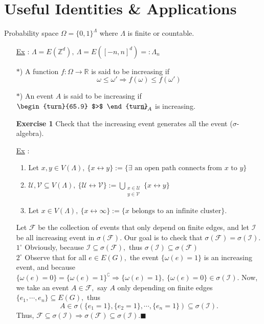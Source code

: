 \documentclass[12pt,a4paper]{report}
\theoremstyle{definition}
\newcommand{\SOL}{\fbox{ \tt s\parbox[b][2pt][c]{6pt}{o}\hspace*{-7pt} L:}}
\newcommand{\indecate}{\mbox{\begin{turn}{65.9}
$>$
\end{turn}\hspace{-10.5pt}\parbox[t][-5pt][c]{10pt}{$\bot$}\hspace{-4.35pt}\parbox[t][-3.4pt][c]{4pt}{$\shortmid$}}}
\begin{document}
\chapter{Useful Identities \& Applications}
\begin{flushleft}
Probability space $\Omega=\{0,1\}^{\Lambda}$ where $\Lambda$ is finite or countable.
\end{flushleft}
\begin{enumerate}
    \item[\underline{Ex} :] $\Lambda=E(\mathbb{Z}^d),\ \Lambda=E([-n,n]^d)=:\Lambda_n$ 
    \begin{center}
    \end{center}
    \item[$*$)] A function $f:\Omega\to\mathbb{R}$ is said to be increasing if 
    \[
    \omega\leq \omega'\Rightarrow f(\omega)\leq f(\omega')
    \]
    \item[$*$)] An event $A$ is said to be increasing if $\indecate_A$ is increasing.
    \item[\textbf{Exercise 1}] Check that the increasing event generates all the event ($\sigma$-algebra).
    \item[\underline{Ex} :] \begin{enumerate}
        \item Let $x,y\in V(\Lambda),\ \{x\leftrightarrow y\}:=\{\exists\mbox{ an open path connects from } x \mbox{ to }y\}$
        \item $\mathcal{U},\mathcal{V}\subseteq V(\Lambda),\ \{\mathcal{U}\leftrightarrow\mathcal{V}\}:=\bigcup\limits_{\substack{x\in \mathcal{U}\\ y\in \mathcal{V}}}\{x\leftrightarrow y\}$
        \item Let $x\in V(\Lambda),\ \{x\leftrightarrow\infty\}:=\{x\mbox{ belongs to an infinite cluster}\}.$
    \end{enumerate}
    \item[\SOL] Let $\mathcal{F}$ be the collection of events that only depend on finite edges, and let $\mathcal{I}$ be all increasing event in $\sigma(\mathcal{F}).$ Our goal is to check that $\sigma(\mathcal{F})=\sigma(\mathcal{I}).$\\[5pt]
    $1^\circ$ Obviously, because $\mathcal{I}\subseteq \sigma(\mathcal{F}),$ thus $\sigma(\mathcal{I})\subseteq \sigma(\mathcal{F})$\\[5pt]
    $2^\circ$ Observe that for all $e\in E(G),$ the event $\{\omega(e)=1\}$ is an increasing event, and because $\{\omega(e)=0\}=\{\omega(e)=1\}^\complement\Rightarrow\{\omega(e)=1\},\ \{\omega(e)=0\}\in \sigma(\mathcal{I}).$ Now, we take an event $A\in \mathcal{F},$ say $A$ only depending on finite edges $\{e_1,\cdots ,e_n\}\subseteq E(G),$ thus 
    \[
    A\in\sigma(\{e_1=1\},\{e_2=1\},\cdots ,\{e_n=1\})\subseteq \sigma(\mathcal{I}).
    \]
    Thus, $\mathcal{F}\subseteq \sigma(\mathcal{I})\Rightarrow\sigma(\mathcal{F})\subseteq \sigma(\mathcal{I}).$\quad $\blacksquare$
\end{enumerate}
\newpage
\end{document}
